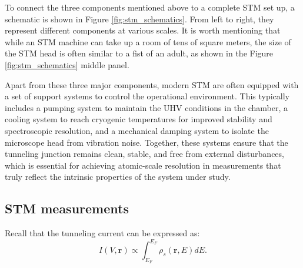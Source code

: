 To connect the three components mentioned above to a complete \ac{STM} set up, a schematic is shown in Figure \ref{fig:stm_schematics}. From left to right, they represent different components at various scales. It is worth mentioning that while an \ac{STM} machine can take up a room of tens of square meters, the size of the \ac{STM} head is often similar to a fist of an adult, as shown in the Figure \ref{fig:stm_schematics} middle panel.

Apart from these three major components, modern \ac{STM} are often equipped with a set of support systems to control the operational environment. This typically includes a pumping system to maintain the UHV conditions in the chamber, a cooling system to reach cryogenic temperatures for improved stability and spectroscopic resolution, and a mechanical damping system to isolate the microscope head from vibration noise. Together, these systems ensure that the tunneling junction remains clean, stable, and free from external disturbances, which is essential for achieving atomic-scale resolution in measurements that truly reflect the intrinsic properties of the system under study.  

\subsection{\ac{STM} measurements}

Recall that the tunneling current can be expressed as:  
\begin{equation}
	I(V,\mathbf{r}) \propto \int_{E_F}^{E_F}\rho_s(\mathbf{r},E)dE. 
\end{equation}

